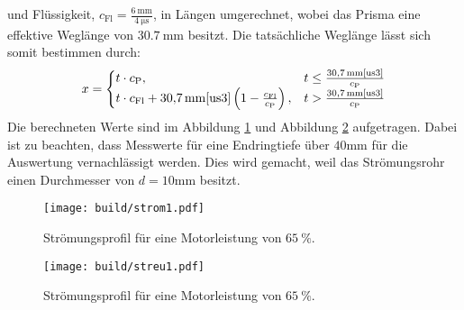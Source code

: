 und Flüssigkeit, $c_\text{Fl}=\frac{\SI{6}{\milli\meter}}{\SI{4}{\micro\second}}$\cite{us3}, in Längen umgerechnet,
wobei das Prisma eine effektive Weglänge von $\SI{30.7}{\milli\meter}$\cite{us3} besitzt.
Die tatsächliche Weglänge lässt sich somit bestimmen durch:
\begin{equation}
	\label{weglänge}
	x =
	\begin{cases}
		t\cdot c_\text{P}, & t \le \frac{\SI{30.7}{\milli\meter}\text{\cite{us3}}}{c_\text{P}} \\
		t\cdot c_\text{Fl} + \SI{30.7}{\milli\meter}\text{\cite{us3}}\left(1-\frac{c_\text{Fl}}{c_\text{P}}\right), & t > \frac{\SI{30.7}{\milli\meter}\text{\cite{us3}}}{c_\text{P}}
	\end{cases}
\end{equation}
Die berechneten Werte sind im Abbildung \ref{ström1fig} und Abbildung \ref{streu1fig} aufgetragen.
Dabei ist zu beachten, dass Messwerte für eine Endringtiefe über $40\si{\milli\meter}$ für die Auswertung vernachlässigt werden.
Dies wird gemacht, weil das Strömungsrohr einen Durchmesser von $d=10\si{\milli\meter}$ besitzt.
\begin{figure}[H]
  \centering
  \texttt{[image: build/strom1.pdf]}
  \caption{Strömungsprofil für eine Motorleistung von $\SI{65}{\percent}$.}
  \label{ström1fig}
\end{figure}
\begin{figure}[H]
  \centering
  \texttt{[image: build/streu1.pdf]}
  \caption{Strömungsprofil für eine Motorleistung von $\SI{65}{\percent}$.}
  \label{streu1fig}
\end{figure}

